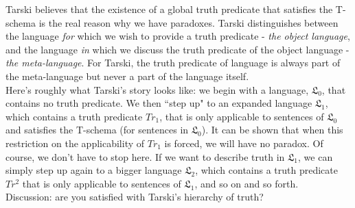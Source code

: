 \documentclass[11pt]{article}
\theoremstyle{definition}
\begin{document}
\noindent
Tarski believes that the existence of a global truth predicate that satisfies the T-schema is the real reason why we have paradoxes. Tarski distinguishes between the language \textit{for} which we wish to provide a truth predicate - \textit{the object language}, and the language \textit{in} which we discuss the truth predicate of the object language - \textit{the meta-language}. For Tarski, the truth predicate of language is always part of the meta-language but never a part of the language itself. \\

\noindent
Here's roughly what Tarski's story looks like: we begin with a language, $\mathfrak{L}_0$, that contains no truth predicate. We then ``step up" to an expanded language $\mathfrak{L}_1$, which contains a truth predicate $Tr_1$, that is only applicable to sentences of $\mathfrak{L}_0$ and satisfies the T-schema (for sentences in $\mathfrak{L}_0$). It can be shown that when this restriction on the applicability of $Tr_1$ is forced, we will have no paradox. Of course, we don't have to stop here. If we want to describe truth in $\mathfrak{L}_1$, we can simply step up again to a bigger language $\mathfrak{L}_2$, which contains a truth predicate $Tr^2$ that is only applicable to sentences of $\mathfrak{L}_1$, and so on and so forth. \\

\noindent
Discussion: are you satisfied with Tarski's hierarchy of truth?
\end{document}
